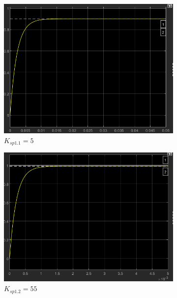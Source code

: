 \documentclass[12pt, a4paper]{report}
\begin{document}
\begin{figure}[h]
    \begin{subfigure}[h!]{0.4\linewidth}
        \includegraphics[width=\linewidth]{s1simk5.png}
        \caption{$K_{sp1.1} = 5$}
    \end{subfigure}
    \hfill
    \begin{subfigure}[h!]{0.4\linewidth}
        \includegraphics[width=\linewidth]{s1simk55.png}
        \caption{$K_{sp1.2} = 55$}
    \end{subfigure}
    \hfill
    \begin{subfigure}[h!]{0.4\linewidth}

\end{subfigure}
\end{figure}
\end{document}
